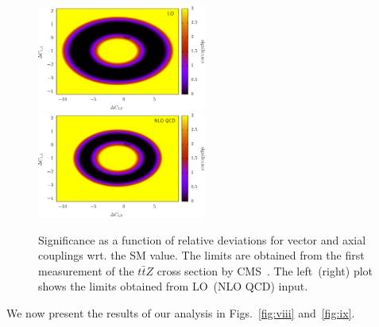 \documentclass[preprint]{JHEP3}
\def\ttbZ{t\bar{t}Z}
\begin{document}
\begin{figure}[t]
\centering %
\includegraphics[width=0.495\textwidth]{./CMSLO_Delta0.40_0213.eps}
\includegraphics[width=0.495\textwidth]{./CMSNLO_Delta0.20_0213.eps}
\caption{\label{fig:v}
Significance as a function of relative deviations for vector and axial couplings wrt. the SM value. 
The limits are obtained from the first measurement of the $\ttbZ$ cross section by CMS~\cite{Chatrchyan:2013qca}. 
The left~(right) plot shows the limits obtained from LO~(NLO QCD) input.
}
\end{figure}




We now present the results of our analysis in Figs.~\ref{fig:viii} and~\ref{fig:ix}.
\end{document}
